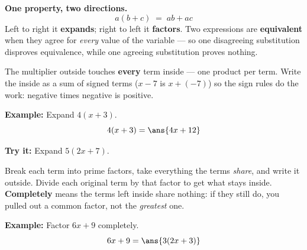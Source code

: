 \documentclass[12pt]{article}
\begin{document}

\begin{formulabox}
\textbf{One property, two directions.}
\[
a(b+c) \;=\; ab + ac
\]
Left to right it \textbf{expands}; right to left it \textbf{factors}. Two
expressions are \textbf{equivalent} when they agree for \emph{every} value of
the variable --- so one disagreeing substitution disproves equivalence, while
one agreeing substitution proves nothing.
\end{formulabox}


\begin{formulabox}
The multiplier outside touches \textbf{every} term inside --- one product per
term. Write the inside as a sum of signed terms ($x - 7$ is $x + (-7)$) so the
sign rules do the work: negative times negative is positive.
\end{formulabox}

\begin{examplebox}
\textbf{Example:} Expand $4(x+3)$.
\[ 4(x+3) = \ans{4x+12} \]
\end{examplebox}

\begin{tryitbox}
\textbf{Try it:} Expand $5(2x+7)$.\\[2pt]
\end{tryitbox}


\begin{formulabox}
Break each term into prime factors, take everything the terms \emph{share}, and
write it outside. Divide each original term by that factor to get what stays
inside.\\[2pt]
\textbf{Completely} means the terms left inside share nothing: if they still do,
you pulled out a common factor, not the \emph{greatest} one.
\end{formulabox}

\begin{examplebox}
\textbf{Example:} Factor $6x + 9$ completely.
\[ 6x + 9 = \ans{3(2x+3)} \]
\end{examplebox}
\end{document}
